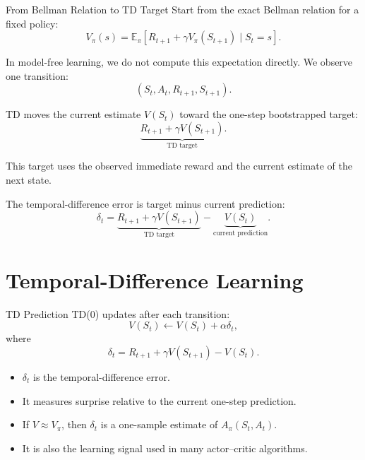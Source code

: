 \documentclass[aspectratio=169]{beamer}
\newcommand{\EE}{\mathbb{E}}
\begin{document}
\begin{frame}{From Bellman Relation to TD Target}
\small
Start from the exact Bellman relation for a fixed policy:
\[
V_\pi(s)=\EE_\pi[R_{t+1}+\gamma V_\pi(S_{t+1})\mid S_t=s].
\]

\vspace{0.4em}
In model-free learning, we do not compute this expectation directly.  We observe one transition:
\[
(S_t,A_t,R_{t+1},S_{t+1}).
\]

\vspace{0.4em}
TD moves the current estimate $V(S_t)$ toward the one-step bootstrapped target:
\[
\underbrace{R_{t+1}+\gamma V(S_{t+1})}_{\text{TD target}}.
\]

\vspace{0.2em}
This target uses the observed immediate reward and the current estimate of the next state.

\vspace{0.3em}
The temporal-difference error is target minus current prediction:
\[
\delta_t=
\underbrace{R_{t+1}+\gamma V(S_{t+1})}_{\text{TD target}}
-
\underbrace{V(S_t)}_{\text{current prediction}}.
\]
\end{frame}

\section{Temporal-Difference Learning}

\begin{frame}{TD Prediction}
\small
TD(0) updates after each transition:
\[
V(S_t)\leftarrow V(S_t)+\alpha\delta_t,
\]
where
\[
\delta_t=R_{t+1}+\gamma V(S_{t+1})-V(S_t).
\]

\vspace{0.7em}
\begin{itemize}
    \item $\delta_t$ is the temporal-difference error.
    \item It measures surprise relative to the current one-step prediction.
    \item If $V\approx V_\pi$, then $\delta_t$ is a one-sample estimate of $A_\pi(S_t,A_t)$.
    \item It is also the learning signal used in many actor--critic algorithms.
\end{itemize}
\end{frame}
\end{document}
